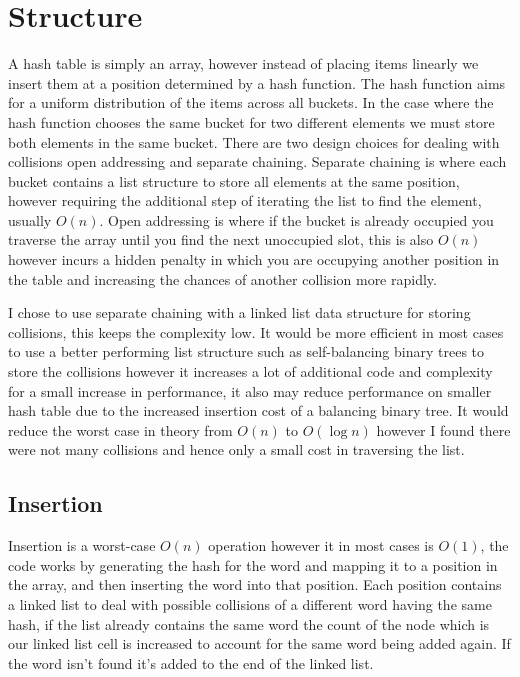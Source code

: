 \documentclass[12pt]{article}
\begin{document}
\section{Structure}
A hash table is simply an array, however instead of placing items linearly we insert them at a position determined by a hash function. The hash function aims for a uniform distribution of the items across all buckets. In the case where the hash function chooses the same bucket for two different elements we must store both elements in the same bucket. There are two design choices for dealing with collisions open addressing and separate chaining. Separate chaining is where each bucket contains a list structure to store all elements at the same position, however requiring the additional step of iterating the list to find the element, usually $O(n)$. Open addressing is where if the bucket is already occupied you traverse the array until you find the next unoccupied slot, this is also $O(n)$ however incurs a hidden penalty in which you are occupying another position in the table and increasing the chances of another collision more rapidly.

I chose to use separate chaining with a linked list data structure for storing collisions, this keeps the complexity low. It would be more efficient in most cases to use a better performing list structure such as self-balancing binary trees to store the collisions however it increases a lot of additional code and complexity for a small increase in performance, it also may reduce performance on smaller hash table due to the increased insertion cost of a balancing binary tree. It would reduce the worst case in theory from $O(n)$ to $O(\log{}n)$ however I found there were not many collisions and hence only a small cost in traversing the list.

\subsection{Insertion}
Insertion is a worst-case $O(n)$ operation however it in most cases is $O(1)$, the code works by generating the hash for the word and mapping it to a position in the array, and then inserting the word into that position. Each position contains a linked list to deal with possible collisions of a different word having the same hash, if the list already contains the same word the count of the node which is our linked list cell is increased to account for the same word being added again. If the word isn't found it's added to the end of the linked list.
\end{document}
